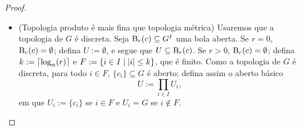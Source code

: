 \begin{proof}
\begin{itemize}
	\item (Topologia produto é mais fina que topologia métrica) Usaremos que a topologia de $G$ é discreta. Seja $\mathrm{B}_r(c) \subseteq G^{I}$ uma bola aberta. Se $r=0$, $\mathrm{B}_r(c) = \emptyset$; defina $U := \emptyset$, e segue que $U \subseteq \mathrm{B}_r(c)$. Se $r>0$, $\mathrm{B}_r(c) = \emptyset$; defina $k := \left\lceil{\log_{\alpha}(r)}\right\rceil$ e $F := \left\{{i \in I}\;\middle\vert\;{\left\vert{i}\right\vert \leq k}\right\}$, que é finito. Como a topologia de $G$ é discreta, para todo $i \in F$, $\{c_i\} \subseteq G$ é aberto; defina assim o aberto básico
		\begin{equation*}
		U := \prod_{i \in I} U_i,
		\end{equation*}
	em que $U_i := \{c_i\}$ se $i \in F$ e $U_i = G$ se $i \notin F$. %



\end{itemize}
\end{proof}
